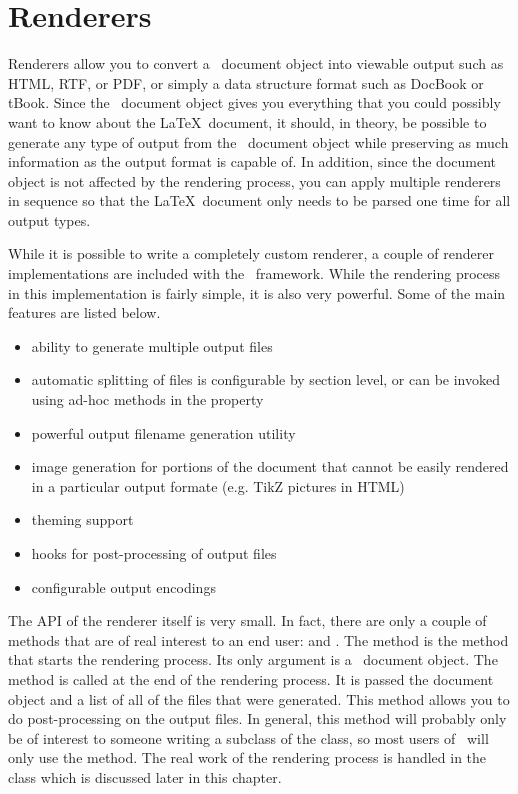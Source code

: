 \chapter{Renderers}

Renderers allow you to convert a \plasTeX\ document object into viewable
output such as HTML, RTF, or PDF, or simply a data structure format such
as DocBook or tBook.  Since the \plasTeX\ document object gives you
everything that you could possibly want to know about the \LaTeX\ document,
it should, in theory, be possible to generate any type of output from
the \plasTeX\ document object while preserving as much information as the
output format is capable of.  In addition, since the document object is
not affected by the rendering process, you can apply multiple renderers
in sequence so that the \LaTeX\ document only needs to be parsed one time
for all output types.

While it is possible to write a completely custom renderer, a couple of
renderer implementations are included with the \plasTeX\ framework.
While the rendering process in this implementation is fairly simple,
it is also very powerful.  Some of the main features are listed below.
\begin{itemize}
\item ability to generate multiple output files
\item automatic splitting of files is configurable by section level,
    or can be invoked using ad-hoc methods in the
     property
\item powerful output filename generation utility
\item image generation for portions of the document that cannot be
    easily rendered in a particular output formate (e.g. TikZ pictures in HTML)
\item theming support
\item hooks for post-processing of output files
\item configurable output encodings
\end{itemize}

The API of the renderer itself is very small.  In fact, there are only
a couple of methods that are of real interest to an end user: 
and .  The  method is the method that starts
the rendering process.  Its only argument is a \plasTeX\ document object.
The  method is called at the end of the rendering process.
It is passed the document object and a list of all of the files that were
generated.  This method allows you to do post-processing on the output files.
In general, this method will probably only be of interest to someone
writing a subclass of the  class, so most users of
\plasTeX\ will only use the  method.  The real work of
the rendering process is handled in the  class which
is discussed later in this chapter.

